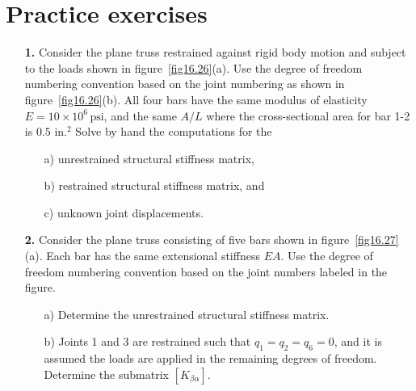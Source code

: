 \documentclass{AeroStructure-ERJohnson}
\begin{document}
\section{Practice exercises}\label{sec16.4}

\begin{exercise}
\begin{enumerate}[\textbf{2.}]
\item[\textbf{1.}] Consider the plane truss restrained against rigid body motion and subject to the loads shown in figure~\ref{fig16.26}(a). Use the degree of freedom numbering convention based on the joint numbering as shown in figure~\ref{fig16.26}(b). All four bars have the same modulus of elasticity $E=10 \times 10^{6}\, \mathrm{psi}$, and the same $A / L$ where the cross-sectional area for bar 1-2 is $0.5 \text { in.}^2$ Solve by hand the computations for the


\vspace*{-1.6pc}

\begin{enumerate}[b)]
\item[{\hskip13pt}a)] unrestrained structural stiffness matrix,
\item[{\hskip13pt}b)] restrained structural stiffness matrix, and
\item[{\hskip13pt}c)] unknown joint displacements.
\end{enumerate}

\item[\textbf{2.}] Consider the plane truss consisting of five bars shown in figure~\ref{fig16.27}(a). Each bar has the same extensional stiffness $E A$. Use the degree of freedom numbering convention based on the joint numbers labeled in the figure.

\begin{enumerate}[b)]
\item[{\hskip13pt}a)] Determine the unrestrained structural stiffness matrix.
\item[{\hskip13pt}b)] Joints 1 and 3 are restrained such that $q_{1}=q_{2}=q_{6}=0$, and it is assumed the loads are applied in the\break\hspace*{35pt} remaining degrees of freedom. Determine the submatrix $\left[K_{\beta \alpha}\right]$.
\end{enumerate}


\end{enumerate}
\end{exercise}
\end{document}
